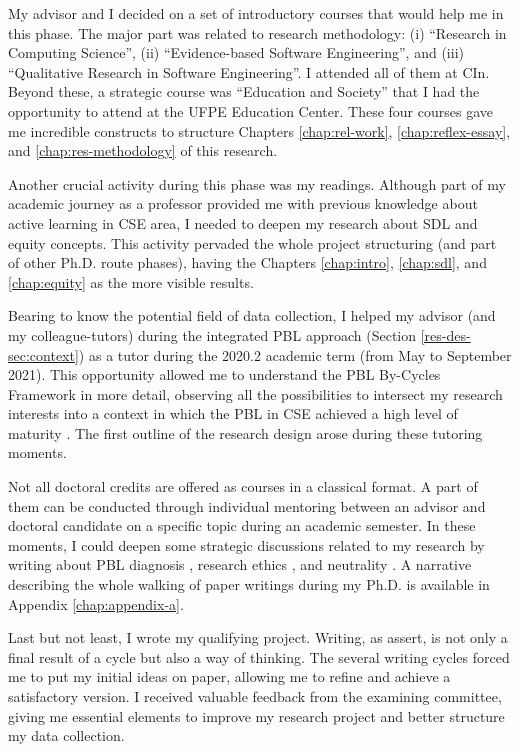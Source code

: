 My advisor and I decided on a set of introductory courses that would help me in this phase. The major part was related to research methodology: (i) “Research in Computing Science”, (ii) “Evidence-based Software Engineering”, and (iii) “Qualitative Research in Software Engineering”. I attended all of them at \gls{CIn}. Beyond these, a strategic course was “Education and Society” that I had the opportunity to attend at the \gls{UFPE} Education Center. These four courses gave me incredible constructs to structure Chapters \ref{chap:rel-work}, \ref{chap:reflex-essay}, and \ref{chap:res-methodology} of this research.

Another crucial activity during this phase was my readings. Although part of my academic journey as a professor provided me with previous knowledge about active learning in \acrfull{CSE} area, I needed to deepen my research about \gls{SDL} and equity concepts. This activity pervaded the whole project structuring (and part of other \gls{Ph.D.} route phases), having the Chapters \ref{chap:intro}, \ref{chap:sdl}, and \ref{chap:equity} as the more visible results.

Bearing to know the potential field of data collection, I helped my advisor (and my colleague-tutors) during the integrated \gls{PBL} approach (Section \ref{res-des-sec:context}) as a tutor during the 2020.2 academic term (from May to September 2021). This opportunity allowed me to understand the \gls{PBL} By-Cycles Framework \cite{alexandre:2018} in more detail, observing all the possibilities to intersect my research interests into a context in which the \gls{PBL} in \gls{CSE} achieved a high level of maturity \cite{santos:2013}. The first outline of the research design arose during these tutoring moments.

Not all doctoral credits are offered as courses in a classical format. A part of them can be conducted through individual mentoring between an advisor and doctoral candidate on a specific topic during an academic semester. In these moments, I could deepen some strategic discussions related to my research by writing about \gls{PBL} diagnosis \cite{santos:2022}, research ethics \cite{bispojr:2021-wei}, and neutrality \cite{bispojr:2022-educomp}. A narrative describing the whole walking of paper writings during my \gls{Ph.D.} is available in Appendix \ref{chap:appendix-a}.

Last but not least, I wrote my qualifying project. Writing, as 
 assert, is not only a final result of a cycle but also a way of thinking. The several writing cycles forced me to put my initial ideas on paper, allowing me to refine and achieve a satisfactory version. I received valuable feedback from the examining committee, giving me essential elements to improve my research project and better structure my data collection.

